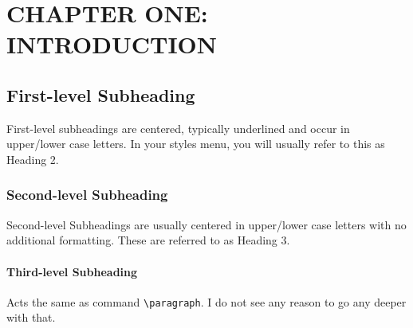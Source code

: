 \chapter{CHAPTER ONE: INTRODUCTION} \label{chapter_1}

\section{First-level Subheading}

First-level subheadings are centered, typically underlined and occur in upper/lower case letters. In your styles menu, you will usually refer to this as Heading 2.

\subsection{Second-level Subheading}

Second-level Subheadings are usually centered in upper/lower case letters with no additional formatting. These are referred to as Heading 3.

\subsubsection{Third-level Subheading} Acts the same as command \verb|\paragraph|. I do not see any reason to go any deeper with that.

